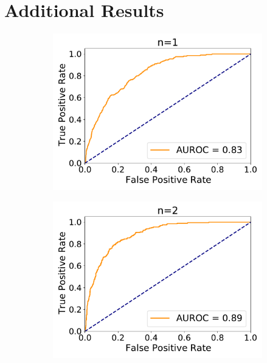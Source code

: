 \chapter{Additional Results}
\begin{figure}[H]
	\begin{subfigure}{.33\textwidth}
		\centering
		\includegraphics[width=1\linewidth]{figures/roc_analysis/roc_exactUpdate/AUROC_2000samples_class0_llh_n1}
		\caption{}
		\label{fig:roc_exact_n1}
	\end{subfigure}%
	\begin{subfigure}{.33\textwidth}
		\centering
		\includegraphics[width=1\linewidth]{figures/roc_analysis/roc_exactUpdate/AUROC_2000samples_class0_llh_n2}
		\caption{}

\end{subfigure}
\end{figure}
